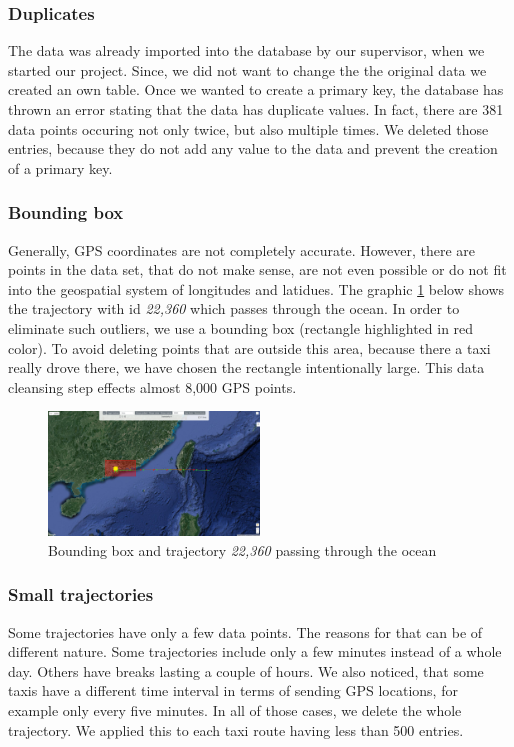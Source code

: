 \documentclass[10pt]{sig-alternate}
\begin{document}
\subsubsection{Duplicates}
The data was already imported into the database by our supervisor, when we started our project. Since, we did not want to change the the original data we created an own table. Once we wanted to create a primary key, the database has thrown an error stating that the data has duplicate values. In fact, there are 381 data points occuring not only twice, but also multiple times. We deleted those entries, because they do not add any value to the data and prevent the creation of a primary key.

\subsubsection{Bounding box}
Generally, GPS coordinates are not completely accurate. However, there are points in the data set, that do not make sense, are not even possible or do not fit into the geospatial system of longitudes and latidues. The graphic \ref{fig:bbox} below shows the trajectory with id \textit{22,360} which passes through the ocean. In order to eliminate such outliers, we use a bounding box (rectangle highlighted in red color). To avoid deleting points that are outside this area, because there a taxi really drove there, we have chosen the rectangle intentionally large. This data cleansing step effects almost 8,000 GPS points.

\begin{figure}[ht]
\centering
\includegraphics[width=0.5\textwidth]{img/bounding_box.png}
\caption{Bounding box and trajectory \textit{22,360} passing through the ocean}
\label{fig:bbox}
\end{figure}


\subsubsection{Small trajectories}
Some trajectories have only a few data points. The reasons for that can be of different nature. Some trajectories include only a few minutes instead of a whole day. Others have breaks lasting a couple of hours. We also noticed, that some taxis have a different time interval in terms of sending GPS locations, for example only every five minutes. In all of those cases, we delete the whole trajectory. We applied this to each taxi route having less than 500 entries.
\end{document}
